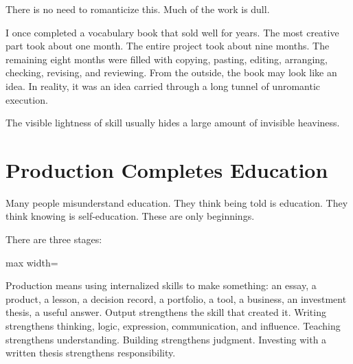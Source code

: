 There is no need to romanticize this. Much of the work is dull.

I once completed a vocabulary book that sold well for years. The most creative part took about one month. The entire project took about nine months. The remaining eight months were filled with copying, pasting, editing, arranging, checking, revising, and reviewing. From the outside, the book may look like an idea. In reality, it was an idea carried through a long tunnel of unromantic execution.

The visible lightness of skill usually hides a large amount of invisible heaviness.

\section*{Production Completes Education}

Many people misunderstand education. They think being told is education. They think knowing is self-education. These are only beginnings.

There are three stages:

\begin{center}
\begin{adjustbox}{max width=\linewidth}
\end{adjustbox}
\end{center}

Production means using internalized skills to make something: an essay, a product, a lesson, a decision record, a portfolio, a tool, a business, an investment thesis, a useful answer. Output strengthens the skill that created it. Writing strengthens thinking, logic, expression, communication, and influence. Teaching strengthens understanding. Building strengthens judgment. Investing with a written thesis strengthens responsibility.

